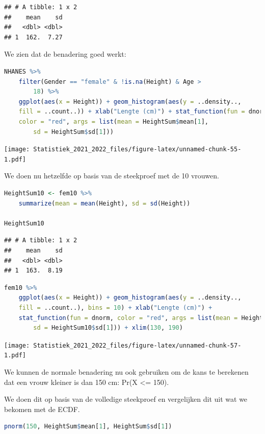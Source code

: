 \documentclass[
  12pt,dutch,coursenotes]{book}
\theoremstyle{definition}
\theoremstyle{definition}
\theoremstyle{definition}
\theoremstyle{definition}
\theoremstyle{remark}
\begin{document}
\begin{lstlisting}
## # A tibble: 1 x 2
##    mean    sd
##   <dbl> <dbl>
## 1  162.  7.27
\end{lstlisting}

We zien dat de benadering goed werkt:

\begin{lstlisting}[language=R]
NHANES %>%
    filter(Gender == "female" & !is.na(Height) & Age >
        18) %>%
    ggplot(aes(x = Height)) + geom_histogram(aes(y = ..density..,
    fill = ..count..)) + xlab("Lengte (cm)") + stat_function(fun = dnorm,
    color = "red", args = list(mean = HeightSum$mean[1],
        sd = HeightSum$sd[1]))
\end{lstlisting}

\texttt{[image: Statistiek\_2021\_2022\_files/figure-latex/unnamed-chunk-55-1.pdf]}

We doen nu hetzelfde op basis van de steekproef met de 10 vrouwen.

\begin{lstlisting}[language=R]
HeightSum10 <- fem10 %>%
    summarize(mean = mean(Height), sd = sd(Height))

HeightSum10
\end{lstlisting}

\begin{lstlisting}
## # A tibble: 1 x 2
##    mean    sd
##   <dbl> <dbl>
## 1  163.  8.19
\end{lstlisting}

\begin{lstlisting}[language=R]
fem10 %>%
    ggplot(aes(x = Height)) + geom_histogram(aes(y = ..density..,
    fill = ..count..), bins = 10) + xlab("Lengte (cm)") +
    stat_function(fun = dnorm, color = "red", args = list(mean = HeightSum10$mean[1],
        sd = HeightSum10$sd[1])) + xlim(130, 190)
\end{lstlisting}

\texttt{[image: Statistiek\_2021\_2022\_files/figure-latex/unnamed-chunk-57-1.pdf]}

We kunnen de normale benadering nu ook gebruiken om de kans te berekenen dat een vrouw kleiner is dan 150 cm: Pr(X \textless= 150).

We doen dit op basis van de volledige steekproef en vergelijken dit uit wat we bekomen met de ECDF.

\begin{lstlisting}[language=R]
pnorm(150, HeightSum$mean[1], HeightSum$sd[1])
\end{lstlisting}
\end{document}
